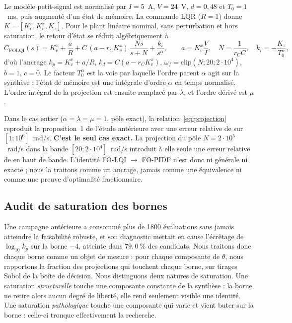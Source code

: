 Le modèle petit-signal est normalisé par $I=5$~A, $V=24$~V, $d=0{,}48$ et
$T_0=1$~ms, puis augmenté d'un état de mémoire. La commande LQR
($R=1$) donne $K=[K_i^x,K_v^x,K_z]$. Pour le plant linéaire nominal, sans
perturbation et hors saturation, le retour d'état se réduit algébriquement à
\begin{equation}
C_\mathrm{FOLQI}(s)=K_v^x+\frac{a}{R}
+C\,(a-r_CK_v^x)\,\frac{N s}{s+N}
+\frac{k_i}{s^\alpha},\qquad
a=K_i^x\frac{V}{I},\quad N=\frac{1}{r_CC},\quad k_i=-\frac{K_z}{T_0^{\alpha}},
\label{eq:projection}
\end{equation}
d'où l'ancrage $k_p=K_v^x+a/R$, $k_d=C(a-r_CK_v^x)$,
$\omega_f=\mathrm{clip}(N;20;2\cdot10^4)$, $b=1$, $c=0$. Le facteur
$T_0^{\alpha}$ est la voie par laquelle l'ordre parent $\alpha$ agit sur la
synthèse : l'état de mémoire est une intégrale d'ordre $\alpha$ en temps
normalisé. L'ordre intégral de la projection est ensuite remplacé par
$\lambda$, et l'ordre dérivé est $\mu$.

Dans le cas entier ($\alpha=\lambda=\mu=1$, pôle exact), la
relation~\eqref{eq:projection} reproduit la proposition~1 de l'étude
antérieure avec une erreur relative de \ChiffreErreurPropUn{} sur
$[1;10^6]$~rad/s. \textbf{C'est le seul cas exact.} La projection du pôle
$N=2\cdot10^5$~rad/s dans la bande $[20;2\cdot10^4]$~rad/s introduit à elle
seule une erreur relative de \ChiffreErreurProjPole{} en haut de bande.
L'identité FO-LQI $\to$ FO-PIDF n'est donc ni générale ni exacte ; nous la
traitons comme un ancrage, jamais comme une équivalence ni comme une preuve
d'optimalité fractionnaire.

\subsection{Audit de saturation des bornes}
\label{sec:audit}

Une campagne antérieure a consommé plus de 1800 évaluations sans jamais
atteindre la faisabilité robuste, et son diagnostic mettait en cause
l'écrêtage de $\log_{10}k_p$ sur la borne $-4$, atteinte dans $79{,}0~\%$ des
candidats. Nous traitons donc chaque borne comme un objet de mesure : pour
chaque composante de $\theta$, nous rapportons la fraction des projections
qui touchent chaque borne, sur \ChiffreAuditN{} tirages Sobol de la boîte de
décision. Nous distinguons deux natures de saturation. Une saturation
\emph{structurelle} touche une composante constante de la synthèse : la borne
ne retire alors aucun degré de liberté, elle rend seulement visible une
identité. Une saturation \emph{pathologique} touche une composante qui varie
et vient buter sur la borne : celle-ci tronque effectivement la recherche.

